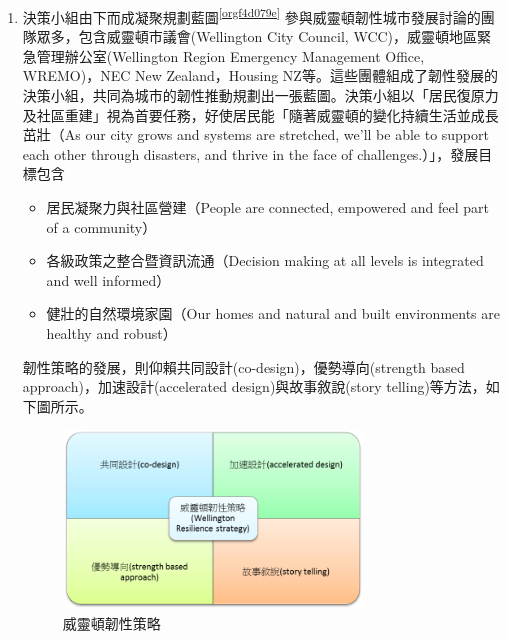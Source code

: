 \documentclass[a4paper,12pt]{article}
\begin{document}
\begin{enumerate}
\item 決策小組由下而成凝聚規劃藍圖\textsuperscript{\ref{orgf4d079e}}
\label{sec:orgd4fd9ef}
參與威靈頓韌性城市發展討論的團隊眾多，包含威靈頓市議會(Wellington City Council, WCC)，威靈頓地區緊急管理辦公室(Wellington Region Emergency Management Office, WREMO)，NEC New Zealand，Housing NZ等。這些團體組成了韌性發展的決策小組，共同為城市的韌性推動規劃出一張藍圖。決策小組以「居民復原力及社區重建」視為首要任務，好使居民能「隨著威靈頓的變化持續生活並成長茁壯（As our city grows and systems are stretched, we’ll be able to support each other through disasters, and thrive in the face of challenges.）」，發展目標包含\\
\begin{itemize}
\item 居民凝聚力與社區營建（People are connected, empowered and feel part of a community）\\
\item 各級政策之整合暨資訊流通（Decision making at all levels is integrated and well informed）\\
\item 健壯的自然環境家園（Our homes and natural and built environments are healthy and robust）\\
\end{itemize}

韌性策略的發展，則仰賴共同設計(co-design)，優勢導向(strength based approach)，加速設計(accelerated design)與故事敘說(story telling)等方法，如下圖所示。\\
\begin{figure}[htbp]
\centering
\includegraphics[width=300]{images/wls.png}
\caption{\label{fig:FigName}威靈頓韌性策略}
\end{figure}


\end{enumerate}
\end{document}
